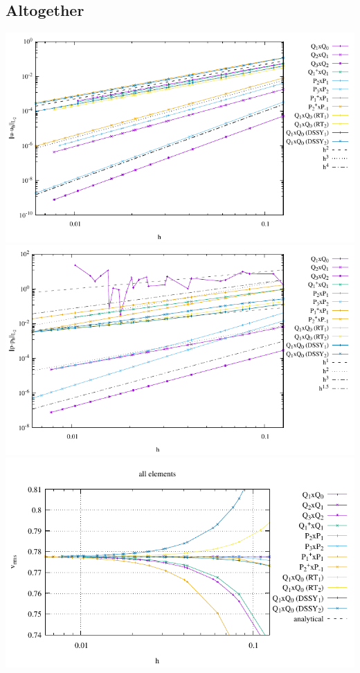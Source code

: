 \newpage
\subsection*{Altogether}


\begin{center}
\includegraphics[width=13.5cm]{python_codes/fieldstone_120/results/errors-velocity-all}\\
\includegraphics[width=13.5cm]{python_codes/fieldstone_120/results/errors-pressure-all}\\
\includegraphics[width=13.5cm]{python_codes/fieldstone_120/results/vrms}
\end{center}


